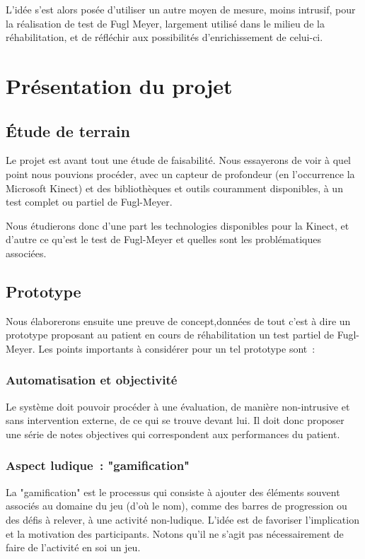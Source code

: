   L'idée s'est alors posée d'utiliser un autre moyen de mesure, moins intrusif, pour la réalisation de test de Fugl Meyer, largement utilisé dans le milieu de la réhabilitation, et de réfléchir aux possibilités d'enrichissement de celui-ci.
\newpage
    \section{Présentation du projet}
    
      \subsection{Étude de terrain} \label{etude_terrain}
    Le projet est avant tout une étude de faisabilité. Nous essayerons de voir
    à quel point nous pouvions procéder, avec un capteur de profondeur (en
    l'occurrence la Microsoft Kinect) et des bibliothèques et outils couramment 
    disponibles, à un test complet ou partiel de Fugl-Meyer.
    
    Nous étudierons donc d'une part les technologies disponibles pour la Kinect,
    et d'autre ce qu'est le test de Fugl-Meyer et quelles sont les 
    problématiques associées.
    
    \subsection{Prototype}
    Nous élaborerons ensuite une preuve de concept,données de tout c'est à dire un 
    prototype proposant au patient en cours de réhabilitation un test partiel 
    de Fugl-Meyer. Les points importants à considérer pour un tel prototype 
    sont~:
    \subsubsection{Automatisation et objectivité}
    Le système doit pouvoir procéder à une évaluation, de manière non-intrusive 
    et sans intervention externe, de ce qui se trouve devant lui. Il doit donc 
    proposer une série de notes objectives qui correspondent aux performances du 
    patient.
    \subsubsection{Aspect ludique~: "gamification"}
    La "gamification" est le processus qui consiste à ajouter des éléments 
    souvent associés au domaine du jeu (d'où le nom), comme des barres de
    progression ou des défis à relever, à une activité non-ludique. L'idée est 
    de favoriser l'implication et la motivation des participants. 
    Notons qu'il ne s'agit pas nécessairement de faire de l'activité en soi un 
    jeu.
